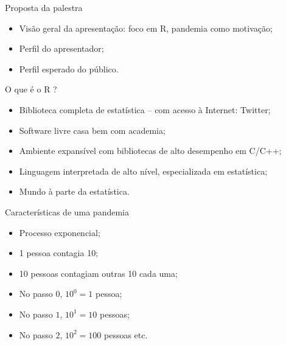 \documentclass[a4paper,10pt]{beamer}
\begin{document}
\lstset{language=R}          %

\begin{frame}
  
\end{frame}

\begin{frame}{Proposta da palestra}
  \begin{itemize}
      \item Visão geral da apresentação: foco em R, pandemia como motivação;
      \item Perfil do apresentador;
      \item Perfil esperado do público.
  \end{itemize}

\end{frame}

\begin{frame}{O que é o R ?}
  \begin{itemize}
      \item Biblioteca completa de estatística -- com acesso à 
	  Internet: Twitter;
      \item Software livre casa bem com academia;
      \item Ambiente expansível com bibliotecas de alto desempenho em C/C++;
      \item Linguagem interpretada de alto nível, especializada em estatística;
      \item Mundo à parte da estatística.
  \end{itemize}

\end{frame}

\begin{frame}{Características de uma pandemia}
  \begin{itemize}
      \item Processo exponencial;
      \item 1 pessoa contagia 10;
      \item 10 pessoas contagiam outras 10 cada uma;
      \item No passo $0$, $10^0 = 1 $ pessoa;
      \item No passo $1$, $10^1 = 10$ pessoas;
      \item No passo $2$, $10^2 = 100$ pessoas etc.
  \end{itemize}

\end{frame}
\end{document}
